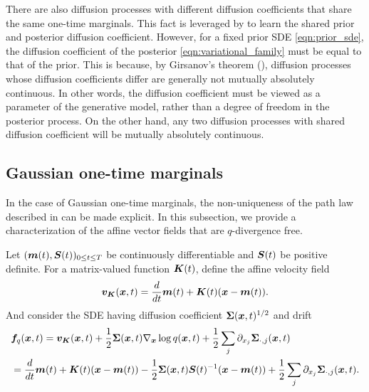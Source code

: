 There are also diffusion processes with different diffusion coefficients that share the same one-time marginals. This fact is leveraged by \citet{bartosh2025sde} to learn the shared prior and posterior diffusion coefficient. 
However, for a fixed prior SDE \cref{eqn:prior_sde}, the diffusion coefficient of the posterior \cref{eqn:variational_family} must be equal to that of the prior. 
This is because, by Girsanov's theorem (), diffusion processes whose diffusion coefficients differ are generally not mutually absolutely continuous. 
In other words, the diffusion coefficient must be viewed as a parameter of the generative model, rather than a degree of freedom in the posterior process. 
On the other hand, any two diffusion processes with shared diffusion coefficient will be mutually absolutely continuous.

\subsection{Gaussian one-time marginals}
\label{app:subsec:gaussian}

In the case of Gaussian one-time marginals, the non-uniqueness of the path law described in  can be made explicit. In this subsection, we provide a characterization of the affine vector fields that are $q$-divergence free.

Let $(\boldsymbol{m}(t),\boldsymbol{S}(t))_{0\leq t\leq T}$ be continuously differentiable and $\boldsymbol{S}(t)$ be positive definite. 
For a matrix-valued function $\boldsymbol{K}(t)$, define the affine velocity field
\begin{equation}\label{eq:gaussian-affine-velocity}
    \boldsymbol{v}_{\boldsymbol{K}}(\boldsymbol{x},t) = \frac{d}{d t}\boldsymbol{m}(t) + \boldsymbol{K}(t)(\boldsymbol{x}- \boldsymbol{m}(t)).
\end{equation}
And consider the SDE having diffusion coefficient $\boldsymbol{\Sigma}(\boldsymbol{x},t)^{1/2}$ and drift
\begin{equation}\label{app:eq:gaussian-compatible-drift}
\begin{aligned}
    &\boldsymbol{f}_{q}(\boldsymbol{x},t) = \boldsymbol{v}_{\boldsymbol{K}}(\boldsymbol{x},t) + \frac{1}{2}\boldsymbol{\Sigma}(\boldsymbol{x},t)\nabla_{\boldsymbol{x}}\log q(\boldsymbol{x},t) + \frac{1}{2}\sum_j \partial_{x_j}\boldsymbol{\Sigma}_{\cdot,j}(\boldsymbol{x},t)\\
    &= \frac{d}{dt}\boldsymbol{m}(t) + \boldsymbol{K}(t)(\boldsymbol{x}-\boldsymbol{m}(t)) - \frac{1}{2}\boldsymbol{\Sigma}(\boldsymbol{x},t)\boldsymbol{S}(t)^{-1}(\boldsymbol{x}-\boldsymbol{m}(t)) + \frac{1}{2}\sum_j \partial_{x_j}\boldsymbol{\Sigma}_{\cdot,j}(\boldsymbol{x},t).
\end{aligned}
\end{equation}

